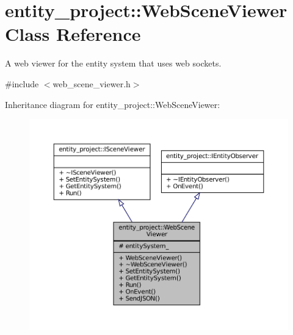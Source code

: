 \hypertarget{classentity__project_1_1WebSceneViewer}{}\section{entity\+\_\+project\+:\+:Web\+Scene\+Viewer Class Reference}
\label{classentity__project_1_1WebSceneViewer}


A web viewer for the entity system that uses web sockets.  




{\ttfamily \#include $<$web\+\_\+scene\+\_\+viewer.\+h$>$}



Inheritance diagram for entity\+\_\+project\+:\+:Web\+Scene\+Viewer\+:
\nopagebreak
\begin{figure}[H]
\begin{center}
\leavevmode
\includegraphics[width=350pt]{classentity__project_1_1WebSceneViewer__inherit__graph}
\end{center}
\end{figure}
